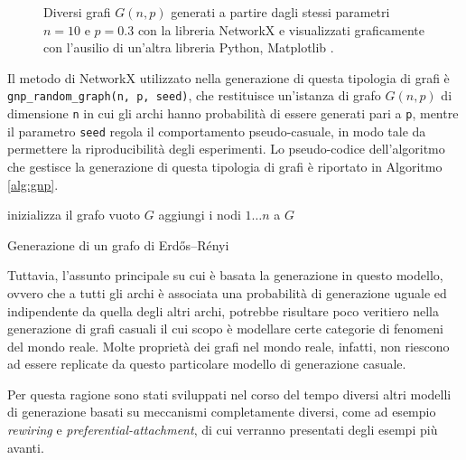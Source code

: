 \begin{figure}[h!]
\begin{subfigure}[b]{0.29\textwidth}
     \end{subfigure}
        \caption{Diversi grafi $G(n,p)$ generati a partire dagli stessi parametri $n=10$ e $p=0.3$ con la libreria NetworkX e visualizzati graficamente con l'ausilio di un'altra libreria Python, Matplotlib \cite{Hunter2007}.}
        \label{fig:gnpes}
\end{figure}

Il metodo di NetworkX utilizzato nella generazione di questa tipologia di grafi è \linebreak
\texttt{gnp\_random\_graph(n, p, seed)}, che restituisce un'istanza di grafo $G(n,p)$ di dimensione \texttt{n} in cui gli archi hanno probabilità di essere generati pari a \texttt{p}, mentre il parametro \texttt{seed} regola il comportamento pseudo-casuale, in modo tale da permettere la riproducibilità degli esperimenti. Lo pseudo-codice dell'algoritmo che gestisce la generazione di questa tipologia di grafi è riportato in Algoritmo \ref{alg:gnp}.

\begin{algorithm}
\SetAlgoLined
{}
 inizializza il grafo vuoto $G$\;
 aggiungi i nodi $1 \dots n$ a $G$\;
 \caption{Generazione di un grafo di Erdős–Rényi}
 \label{alg:gnp}
\end{algorithm}

Tuttavia, l'assunto principale su cui è basata la generazione in questo modello, ovvero che a tutti gli archi è associata una probabilità di generazione uguale ed indipendente da quella degli altri archi, potrebbe risultare poco veritiero nella generazione di grafi casuali il cui scopo è modellare certe categorie di fenomeni del mondo reale. Molte proprietà dei grafi nel mondo reale, infatti, non riescono ad essere replicate da questo particolare modello di generazione casuale.

Per questa ragione sono stati sviluppati nel corso del tempo diversi altri modelli di generazione basati su meccanismi completamente diversi, come ad esempio \textit{rewiring} e \textit{preferential-attachment}, di cui verranno presentati degli esempi più avanti. 


